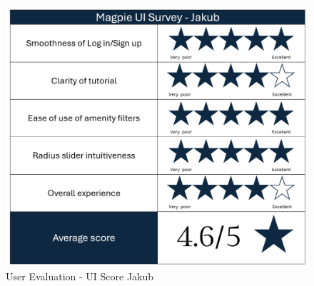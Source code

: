\begin{figure}[h!]
    \centering
    \includegraphics[width=\textwidth]{images/survey-jakub.png}
    \caption{User Evaluation - UI Score Jakub}
    \label{fig:jakubscore}
\end{figure}
